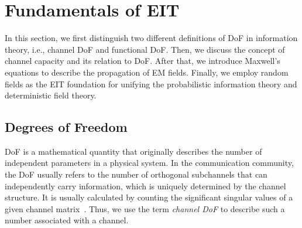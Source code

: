 \documentclass[journal,twocolumn]{IEEEtran}
\begin{document}
\vspace{-1em}
\section{Fundamentals of EIT}
In this section, we first distinguish two different definitions of DoF in information theory, i.e., channel DoF and functional DoF.  
Then, we discuss the concept of channel capacity and its relation to DoF. 
After that, we introduce Maxwell's equations to describe the propagation of EM fields. 
Finally, we employ random fields as the EIT foundation for unifying the probabilistic information theory and deterministic field theory. 



\vspace{-1em}
\subsection{Degrees of Freedom}
\label{Sec_2_Subsec_1}
DoF is a mathematical quantity that originally describes the number of independent parameters in a physical system. 
In the communication community, the DoF usually refers to the number of orthogonal subchannels that can independently carry information, which is uniquely determined by the channel structure. It is usually calculated by counting the significant singular values of a given channel matrix~\cite{goldsmith2003capacity}. 
Thus, we use the term {{\emph{channel DoF}}} to describe such a number associated with a channel.
\end{document}
